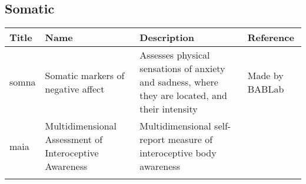 \documentclass[]{book}
\begin{document}
\hypertarget{somatic}{%
\subsection{Somatic}\label{somatic}}

\begin{longtable}[]{@{}llll@{}}
\toprule
\begin{minipage}[b]{0.22\columnwidth}\raggedright
Title\strut
\end{minipage} & \begin{minipage}[b]{0.27\columnwidth}\raggedright
Name\strut
\end{minipage} & \begin{minipage}[b]{0.22\columnwidth}\raggedright
Description\strut
\end{minipage} & \begin{minipage}[b]{0.18\columnwidth}\raggedright
Reference\strut
\end{minipage}\tabularnewline
\midrule
\endhead
\begin{minipage}[t]{0.22\columnwidth}\raggedright
somna\strut
\end{minipage} & \begin{minipage}[t]{0.27\columnwidth}\raggedright
Somatic markers of negative affect\strut
\end{minipage} & \begin{minipage}[t]{0.22\columnwidth}\raggedright
Assesses physical sensations of anxiety and sadness, where they are located, and their intensity\strut
\end{minipage} & \begin{minipage}[t]{0.18\columnwidth}\raggedright
Made by BABLab\strut
\end{minipage}\tabularnewline
\begin{minipage}[t]{0.22\columnwidth}\raggedright
maia\strut
\end{minipage} & \begin{minipage}[t]{0.27\columnwidth}\raggedright
Multidimensional Assessment of Interoceptive Awareness\strut
\end{minipage} & \begin{minipage}[t]{0.22\columnwidth}\raggedright
Multidimensional self-report measure of interoceptive body awareness\strut
\end{minipage} & \begin{minipage}[t]{0.18\columnwidth}\raggedright
\strut
\end{minipage}\tabularnewline
\begin{minipage}[t]{0.22\columnwidth}\raggedright

\end{minipage}
\end{longtable}
\end{document}
